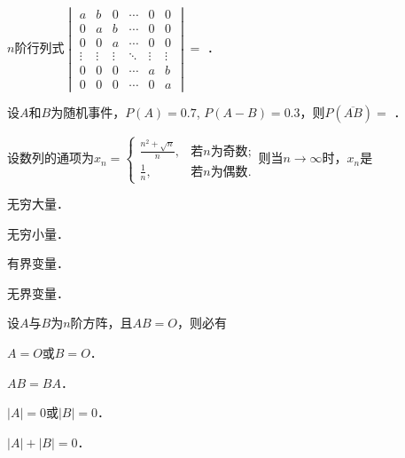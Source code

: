 \documentclass[plain,noanswer,medmath]{../../template/jnuexam}
\begin{document}












\begin{problem}
$n$阶行列式$\begin{vmatrix}
       a &      b &      0 & \cdots &      0 & 0 \\
       0 &      a &      b & \cdots &      0 & 0 \\
       0 &      0 &      a & \cdots &      0 & 0 \\
  \vdots & \vdots & \vdots & \ddots & \vdots & \vdots \\
       0 &      0 &      0 & \cdots &      a & b \\
       0 &      0 &      0 & \cdots &      0 & a
\end{vmatrix} =$ \fillin{}．
\end{problem}


\begin{problem}
设$A$和$B$为随机事件，$P(A) = 0.7$, $P(A - B) = 0.3$，则$P(\overline{AB}) =$ \fillin{}．
\end{problem}






\begin{problem}
设数列的通项为$x_n = \begin{cases}
  \frac{n^2 + \sqrt{n}}{n}, & \text{若$n$为奇数}; \\
               \frac{1}{n}, & \text{若$n$为偶数}.
\end{cases}$则当$n \to \infty$时，$x_n$是\pickout{}
\begin{abcd}
\item 无穷大量．   
\item 无穷小量．   
\item 有界变量．   
\item 无界变量．
\end{abcd}
\end{problem}


\begin{problem}
设$A$与$B$为$n$阶方阵，且$AB = O$，则必有\pickout{}
\begin{abcd}
\item $A = O$或$B = O$．					
\item $AB = BA$．
\item $|A| = 0$或$|B| = 0$．					
\item $|A| + |B| = 0$．
\end{abcd}
\end{problem}
\end{document}
